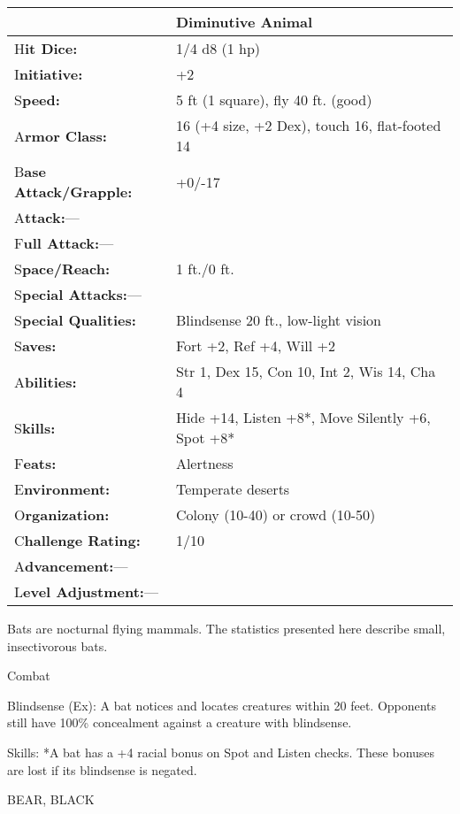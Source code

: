 \documentclass{article}
\begin{document}
\begin{tabular}{|>{\raggedright}p{91pt}|>{\raggedright}p{201pt}|}
\hline
  & Diminutive Animal\tabularnewline
\hline
H\textbf{it Dice:} & 1/4 d8 (1 hp)\tabularnewline
\hline
I\textbf{nitiative:} & +2\tabularnewline
\hline
S\textbf{peed:} & 5 ft (1 square), fly 40 ft. (good)\tabularnewline
\hline
A\textbf{rmor Class:} & 16 (+4 size, +2 Dex), touch 16, flat-footed 14\tabularnewline
\hline
B\textbf{ase Attack/Grapple:} & +0/-17\tabularnewline
\hline
A\textbf{ttack:}--- & \tabularnewline
\hline
F\textbf{ull Attack:}--- & \tabularnewline
\hline
S\textbf{pace/Reach:} & 1 ft./0 ft.\tabularnewline
\hline
S\textbf{pecial Attacks:}--- & \tabularnewline
\hline
S\textbf{pecial Qualities:} & Blindsense 20 ft., low-light vision\tabularnewline
\hline
S\textbf{aves:} & Fort +2, Ref +4, Will +2\tabularnewline
\hline
A\textbf{bilities:} & Str 1, Dex 15, Con 10, Int 2, Wis 14, Cha 4\tabularnewline
\hline
S\textbf{kills:} & Hide +14, Listen +8*, Move Silently +6, Spot +8*\tabularnewline
\hline
F\textbf{eats:} & Alertness\tabularnewline
\hline
E\textbf{nvironment:} & Temperate deserts\tabularnewline
\hline
O\textbf{rganization:} & Colony (10-40) or crowd (10-50)\tabularnewline
\hline
C\textbf{hallenge Rating:} & 1/10\tabularnewline
\hline
A\textbf{dvancement:}--- & \tabularnewline
\hline
L\textbf{evel Adjustment:}--- & \tabularnewline
\hline
\end{tabular}

Bats are nocturnal flying mammals. The statistics presented here describe small, 
insectivorous bats.

Combat

Blindsense (Ex): A bat notices and locates creatures within 20 feet. Opponents 
still have 100\% concealment against a creature with blindsense.

Skills: *A bat has a +4 racial bonus on Spot and Listen checks. These bonuses are 
lost if its blindsense is negated.

\vspace{12pt}
BEAR, BLACK
\end{document}
